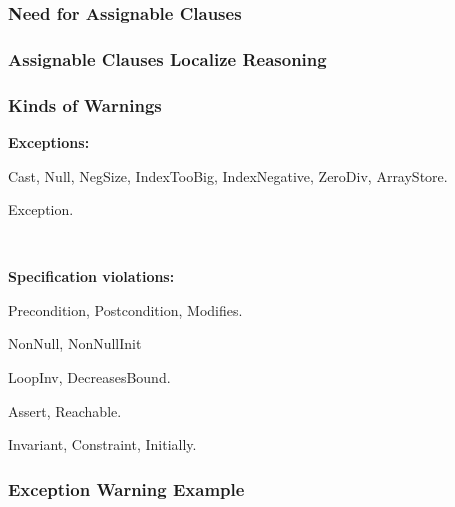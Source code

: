 \begin{frame}[fragile]
\frametitle{Need for Assignable Clauses}

\end{frame}

\begin{frame}[fragile]
\frametitle{Assignable Clauses Localize Reasoning}

\end{frame}

\begin{frame}
\frametitle{Kinds of Warnings}

\alert{\textbf{Exceptions:}}
\begin{description}[Undeclared:]
\item[Runtime:]
Cast, Null, NegSize, IndexTooBig, IndexNegative, ZeroDiv,
ArrayStore.

\item[Undeclared:] 
Exception.
\end{description}

~

\alert{\textbf{Specification violations:}}
\begin{description}
\item[Method:]
Precondition, Postcondition, Modifies.

\item[Non-null:]
NonNull, NonNullInit

\item[Loop:]
LoopInv, DecreasesBound.

\item[Flow:]
Assert, Reachable.

\item[Class:]
Invariant, Constraint, Initially.
\end{description}
\end{frame}

\begin{frame}[fragile]
\frametitle{Exception Warning Example}
\begin{example}

\end{example}
\end{frame}

